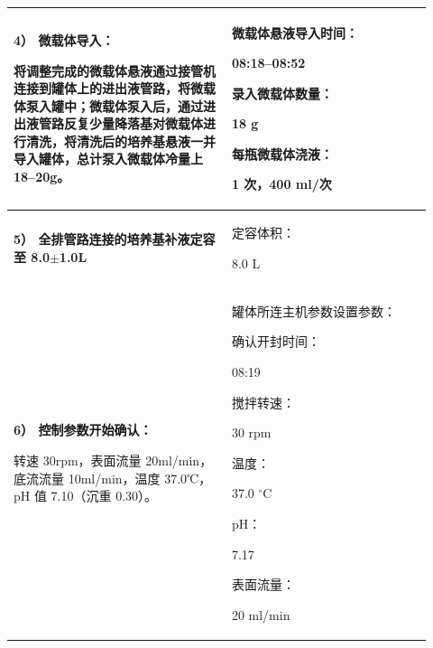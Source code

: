 \documentclass[UTF8,10pt,a4paper,fontset=fandol]{ctexart}
\newcommand{\fieldvalue}[1]{#1}
\newcommand{\handwritten}[1]{#1}
\begin{document}
\begin{tabular}{|p{0.48\linewidth}|p{0.44\linewidth}|}
\hline
\textbf{4） 微载体导入：}

将调整完成的微载体悬液通过接管机连接到罐体上的进出液管路，将微载体泵入罐中；微载体泵入后，通过进出液管路反复少量降落基对微载体进行清洗，将清洗后的培养基悬液一并导入罐体，总计泵入微载体冷量上18--20g。 &
微载体悬液导入时间：

\fieldvalue{\handwritten{08:18--08:52}}

录入微载体数量：

\fieldvalue{\handwritten{18}} g

每瓶微载体浇液：

\fieldvalue{\handwritten{1}} 次，\fieldvalue{\handwritten{400}} ml/次
\\ \hline

\textbf{5） 全排管路连接的培养基补液定容至 8.0$\pm$1.0L} &
定容体积：

\fieldvalue{\handwritten{8.0}} L
\\ \hline

\textbf{6） 控制参数开始确认：}

转速 30rpm，表面流量 20ml/min，底流流量 10ml/min，温度 37.0℃，pH 值 7.10（沉重 0.30）。 &
罐体所连主机参数设置参数：

确认开封时间：

\fieldvalue{\handwritten{08:19}}

搅拌转速：

\fieldvalue{\handwritten{30}} rpm

温度：

\fieldvalue{\handwritten{37.0}} $^\circ$C

pH：

\fieldvalue{\handwritten{7.17}}

表面流量：

\fieldvalue{\handwritten{20}} ml/min


\end{tabular}
\end{document}
